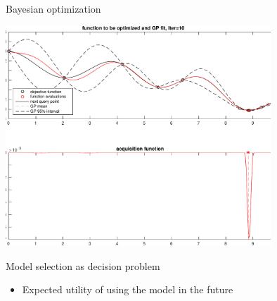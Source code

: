 \documentclass[t]{beamer}
\begin{document}
\begin{frame}
  
  {\Large\color{navyblue} Bayesian optimization}

    \includegraphics[width=10cm]{bayesopt_1d_regular_iter10-crop.pdf}

\end{frame}

\begin{frame}
  
  {\Large\color{navyblue} Model selection as decision problem}

  \begin{itemize}
  \item Expected utility of using the model in the future
  \end{itemize}

\end{frame}
\end{document}
